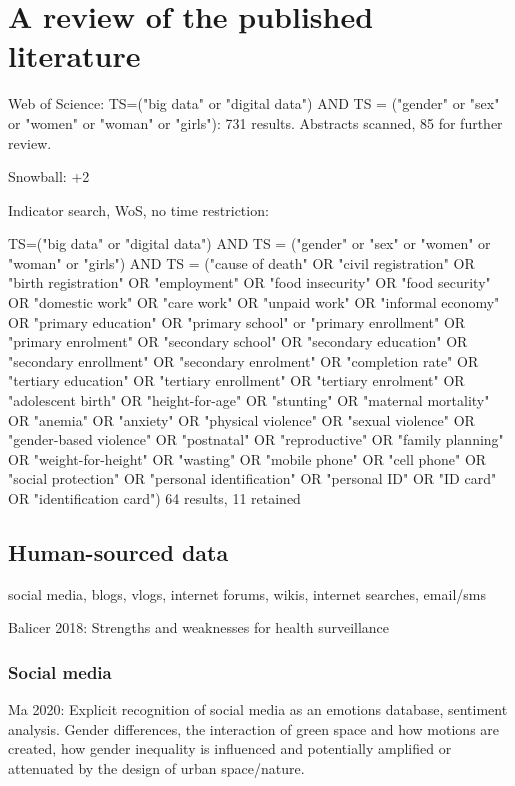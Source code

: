 \documentclass{article}
\begin{document}
\section{A review of the published literature}

Web of Science:
TS=("big data" or "digital data")  AND TS = ("gender" or "sex" or "women" or "woman" or "girls"): 731 results.
Abstracts scanned, 85 for further review.

Snowball: +2



Indicator search, WoS, no time restriction:

TS=("big data" or "digital data")  AND TS = ("gender" or "sex" or "women" or "woman" or "girls") AND TS = ("cause of death" OR "civil registration" OR "birth registration" OR "employment" OR "food insecurity" OR "food security" OR "domestic work" OR "care work" OR "unpaid work" OR "informal economy" OR  "primary education" OR "primary school"  or "primary enrollment" OR "primary enrolment" OR "secondary school" OR "secondary education" OR "secondary enrollment" OR "secondary enrolment" OR "completion rate" OR "tertiary education" OR "tertiary enrollment" OR "tertiary enrolment" OR "adolescent birth" OR "height-for-age" OR "stunting" OR "maternal mortality" OR "anemia" OR "anxiety" OR "physical violence" OR "sexual violence" OR "gender-based violence" OR "postnatal" OR "reproductive" OR "family planning" OR "weight-for-height" OR "wasting" OR "mobile phone" OR "cell phone" OR "social protection" OR "personal identification" OR "personal ID" OR "ID card" OR "identification card")
64 results, 11 retained


\subsection{Human-sourced data}

social media, blogs, vlogs, internet forums, wikis, internet searches, email/sms

Balicer 2018: Strengths and weaknesses for health surveillance

\subsubsection{Social media}

Ma 2020: Explicit recognition of social media as an emotions database, sentiment analysis. Gender differences, the interaction of green space and how motions are created, how gender inequality is influenced and potentially amplified or attenuated by the design of urban space/nature. 
\end{document}

